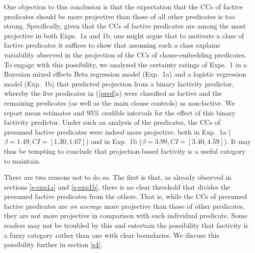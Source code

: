 \documentclass[11pt,fleqn]{article}
\newcommand{\6}{\mbox{$[\hspace*{-.6mm}[$}}
\newcommand{\9}{\mbox{$]\hspace*{-.6mm}]$}}
\begin{document}
One objection to this conclusion is that the expectation that the CCs of factive predicates should be more projective than those of all other predicates is too strong. Specifically, given that the CCs of factive predicates are among the most projective in both Exps.~1a and 1b, one might argue that to motivate a class of factive predicates it suffices to show that assuming such a class explains  variability observed in the projection of the CCs of clause-embedding predicates. To engage with this possibility, we analyzed the certainty ratings of Exps.~1 in a Bayesian mixed effects Beta regression model (Exp.~1a) and a logistic regression model (Exp.~1b) that predicted projection from a binary factivity predictor, whereby the five predicates in (\ref{pred}a) were classified as factive and the remaining predicates (as well as the main clause controls) as non-factive. We report mean estimates and 95\% credible intervals for the effect of this binary factivity predictor. Under such an analysis of the predicates, the CCs of presumed factive predicates were indeed more projective, both in Exp.~1a ($\beta = 1.49, CI = [1.30, 1.67]$) and in Exp.~1b ($\beta = 3.99, CI = [3.40,4.59]$). It may thus be tempting to conclude that projection-based factivity is a useful category to maintain.


There are two reasons not to do so. The first is that, as already observed in sections  \ref{s-exp1a} and \ref{s-exp1b}, there is no clear threshold that divides the presumed factive predicates from the others. That is, while the CCs of presumed factive predicates are \emph{on average} more projective than those of other predicates, they are not more projective in comparison with each individual predicate.  Some readers may not be troubled by this and entertain the possibility that factivity is a fuzzy category rather than one with clear boundaries. We discuss this possibility further in section \ref{s4}.
\end{document}
